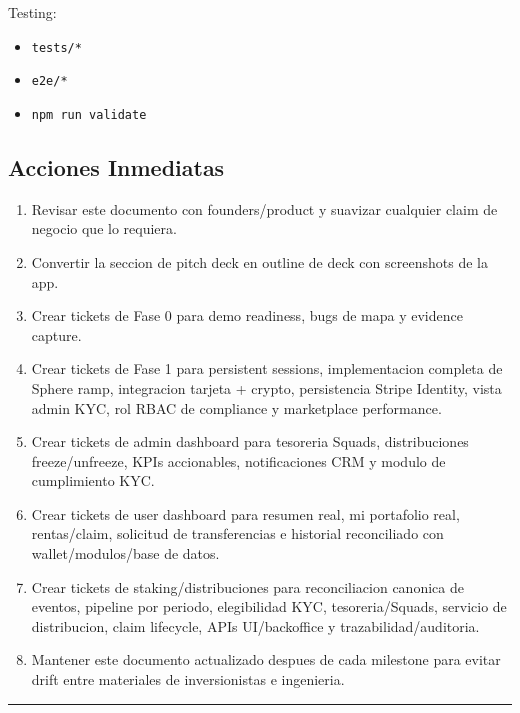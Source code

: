\documentclass[
  10pt,
  letterpaper,
]{article}
\providecommand{\tightlist}{%
  \setlength{\itemsep}{0pt}\setlength{\parskip}{0pt}}
\let\oldtexttt\texttt
\renewcommand{\texttt}[1]{\oldtexttt{\small #1}}
\begin{document}
Testing:

\begin{itemize}
\tightlist
\item
  \texttt{tests/*}
\item
  \texttt{e2e/*}
\item
  \texttt{npm\ run\ validate}
\end{itemize}

\subsection{Acciones Inmediatas}\label{acciones-inmediatas}

\begin{enumerate}
\def\labelenumi{\arabic{enumi}.}
\tightlist
\item
  Revisar este documento con founders/product y suavizar cualquier claim
  de negocio que lo requiera.
\item
  Convertir la seccion de pitch deck en outline de deck con screenshots
  de la app.
\item
  Crear tickets de Fase 0 para demo readiness, bugs de mapa y evidence
  capture.
\item
  Crear tickets de Fase 1 para persistent sessions, implementacion
  completa de Sphere ramp, integracion tarjeta + crypto, persistencia
  Stripe Identity, vista admin KYC, rol RBAC de compliance y marketplace
  performance.
\item
  Crear tickets de admin dashboard para tesoreria Squads, distribuciones
  freeze/unfreeze, KPIs accionables, notificaciones CRM y modulo de
  cumplimiento KYC.
\item
  Crear tickets de user dashboard para resumen real, mi portafolio real,
  rentas/claim, solicitud de transferencias e historial reconciliado con
  wallet/modulos/base de datos.
\item
  Crear tickets de staking/distribuciones para reconciliacion canonica
  de eventos, pipeline por periodo, elegibilidad KYC, tesoreria/Squads,
  servicio de distribucion, claim lifecycle, APIs UI/backoffice y
  trazabilidad/auditoria.
\item
  Mantener este documento actualizado despues de cada milestone para
  evitar drift entre materiales de inversionistas e ingenieria.
\end{enumerate}

\begin{center}\rule{0.5\linewidth}{0.5pt}\end{center}
\end{document}
